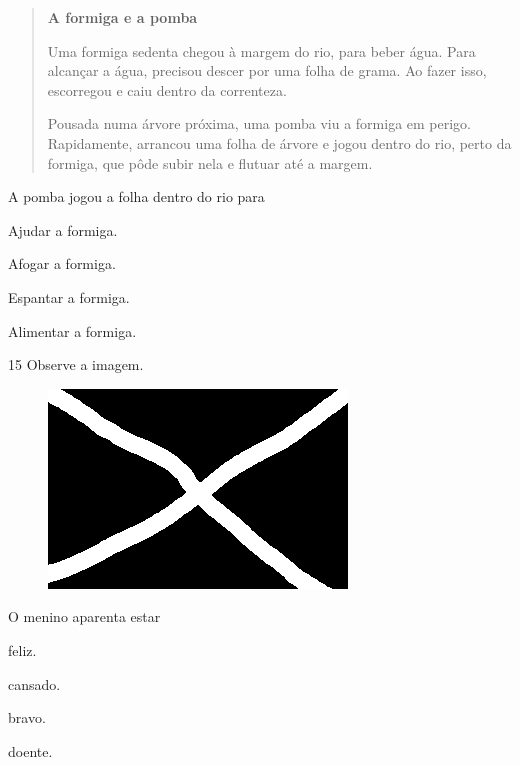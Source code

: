 \begin{quote}
\textbf{A formiga e a pomba}

Uma formiga sedenta chegou à margem do rio, para beber água. Para alcançar a água, precisou descer por uma folha de grama. Ao fazer isso, escorregou e caiu dentro da correnteza.

Pousada numa árvore próxima, uma pomba viu a formiga em perigo. Rapidamente, arrancou uma folha de árvore e jogou dentro do rio, perto da formiga, que pôde subir nela e flutuar até a margem.
\end{quote}


A pomba jogou a folha dentro do rio para

\begin{escolha}
\item Ajudar a formiga.

\item Afogar a formiga.

\item Espantar a formiga.

\item Alimentar a formiga.
\end{escolha}


\num{15} Observe a imagem.

\begin{figure}[htpb!]
\centering
\includegraphics[width=.5\textwidth]{media/confederados.png}
\end{figure}

O menino aparenta estar

\begin{escolha}
\item feliz.

\item cansado.

\item bravo.

\item doente.
\end{escolha}

